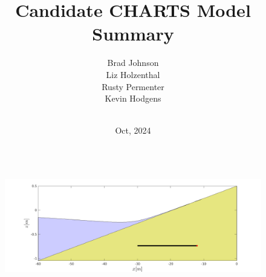 \documentclass[aspectratio=169]{beamer}
\title[CHARTS]{Candidate CHARTS Model Summary} %
\author[]{Brad Johnson\\Liz Holzenthal\\Rusty Permenter \\Kevin Hodgens } %
\institute[ERDC] %
{USACE Engineering Research and Devlelopment Center \\ %
\medskip
\textit{} %
}
\date{\vspace*{-0cm}\\ Oct, 2024} %
\begin{document}
\begin{frame}
  \begin{columns}[c] %
    
    \titlepage %
    \begin{figure}
            \includegraphics[width=1\linewidth]{./present.png}
    \end{figure}
    
  \end{columns}
\end{frame}
\end{document}
